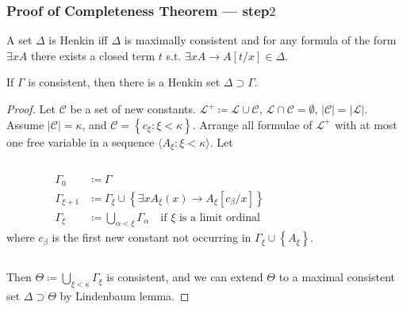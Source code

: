 \documentclass[UTF8,11pt,colorlinks,compress,openany]{beamer}%
\begin{document}
\begin{frame}\frametitle{Proof of Completeness Theorem --- step$2$}\vspace{-1pt}
	A set $\Delta$ is Henkin iff $\Delta$ is maximally consistent and for any formula of the form $\exists x A$ there exists a closed term $t$ s.t. $\exists x A\to A[t/x]\in\Delta$.\vspace{-1pt}
	\begin{lemma}
		If $\Gamma$ is consistent, then there is a Henkin set $\Delta\supset\Gamma$.
	\end{lemma}\vspace{-1pt}
	\begin{proof}
		Let $\mathcal{C}$ be a set of new constants. $\mathscr{L}^+\coloneqq \mathscr{L}\cup\mathcal{C}$, $\mathscr{L}\cap\mathcal{C}=\emptyset$, $|\mathcal{C}|=|\mathscr{L}|$.\\
		Assume $|\mathcal{C}|=\kappa$, and $\mathcal{C}=\left\{c_\xi: \xi<\kappa\right\}$. Arrange all formulae of $\mathscr{L}^+$ with at most one free variable in a sequence $\langle A_\xi: \xi<\kappa\rangle$. Let\vspace{-10pt}
		\begin{columns}
				\begin{align*}
				\Gamma_0&\coloneqq \Gamma\\
				\Gamma_{\xi+1}&\coloneqq \Gamma_{\xi}\cup\left\{\exists x A_\xi(x)\to A_\xi[c_\beta/x]\right\}\\
				\Gamma_\xi&\coloneqq \bigcup\limits_{\alpha<\xi}\Gamma_\alpha\quad\text{if $\xi$ is a limit ordinal}
				\end{align*}
				where $c_\beta$ is the first new constant not occurring in $\Gamma_\xi\cup\left\{A_\xi\right\}$.
		\end{columns}
		Then $\Theta\coloneqq \bigcup\limits_{\xi<\kappa}\Gamma_\xi$ is consistent, and we can extend $\Theta$ to a maximal consistent set $\Delta\supset\Theta$ by Lindenbaum lemma.
	\end{proof}
\end{frame}
\end{document}
